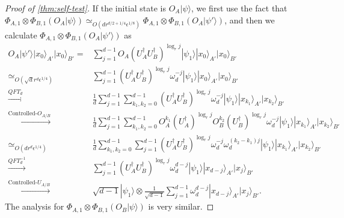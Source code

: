 \documentclass[11pt,letterpaper]{article}
\newcommand{\ket}[1]{|#1\rangle}
\newcommand{\x}{\otimes}
\newcommand{\ct}{^{\dagger}}
\newcommand{\1}{\mathbb{1}}
\newcommand{\ep}{\epsilon}
\newcommand{\sd}{\sqrt{d}}
\newcommand{\appd}[1]{\simeq_{#1}}
\theoremstyle{definition}
\begin{document}
\begin{proof}[Proof of \cref{thm:self-test}]
If the initial state is $O_A\ket{\psi}$, we first use the fact that 
$ \Phi_{A,1} \x \Phi_{B,1} (O_A\ket{\psi}) \appd{O(d r^{d/2+1/4} \ep^{1/8})}  \Phi_{A,1} \x \Phi_{B,1} (O_A\ket{\psi'})$, 
and then we calculate $\Phi_{A,1} \x \Phi_{B,1} (O_A\ket{\psi'})$ as
\begin{align*}
	O_A \ket{\psi'} \ket{x_0}_{A'}\ket{x_0}_{B'} =&  
		\sum_{j=1}^{d-1} O_A(U_A\ct U_B\ct)^{\log_r j}\ket{\psi_1}\ket{x_0}_{A'}\ket{x_0}_{B'}\\
		\appd{O(\sd r^d \ep^{1/4})}&\sum_{j=1}^{d-1}(U_A\ct U_B\ct)^{\log_r j} \omega_d^{-j} \ket{\psi_1} \ket{x_0}_{A'}\ket{x_0}_{B'}\\
		\xrightarrow[]{QFT_d} &\frac{1}{d}\sum_{j=1}^{d-1} \sum_{k_1,k_2 = 0}^{d-1}(U_A\ct U_B\ct)^{\log_r j} \omega_d^{-j} 
		\ket{\psi_1}\ket{x_{k_1}}_{A'}\ket{x_{k_2}}_{B'}\\
		\xrightarrow[]{\text{Controlled-}O_{A/B}}&\frac{1}{d}\sum_{j=1}^{d-1}\sum_{k_1,k_2 = 0}^{d-1} 
		 O_A^{k_1}(U_A\ct)^{\log_r j} O_B^{k_2}(U_B\ct)^{\log_r j} \omega_d^{-j} \ket{\psi_1} 
		 \ket{x_{k_1}}_{A'}\ket{x_{k_2}}_{B'}\\
		\appd{O(d r^{d}  \ep^{1/4})}& \frac{1}{d}\sum_{k_1,k_2 = 0}^{d-1} \sum_{j=1}^{d-1} (U_A\ct U_B\ct)^{\log_r j}
		\omega_d^{-j}\omega_d^{(k_2-k_1)j}\ket{\psi_1}
		 \ket{x_{k_1}}_{A'}\ket{x_{k_2}}_{B'}\\
		\xrightarrow[]{QFT_d^{-1}}& \sum_{j=1}^{d-1}  (U_A\ct U_B\ct)^{\log_r j}  
		\omega_d^{d-j}\ket{\psi_1} \ket{x_{d-j}}_{A'}\ket{x_j}_{B'}\\
		\xrightarrow[]{\text{Controlled-}U_{A/B}}&   \sqrt{d-1} \ket{\psi_1} \x  
		\frac{1}{\sqrt{d-1}}\sum_{j=1}^{d-1} \omega_d^{d-j}\ket{x_{d-j}}_{A'}\ket{x_j}_{B'}.
\end{align*}
The analysis for $\Phi_{A,1} \x\Phi_{B,1} (O_B \ket{\psi})$ is very similar.


\end{proof}
\end{document}
